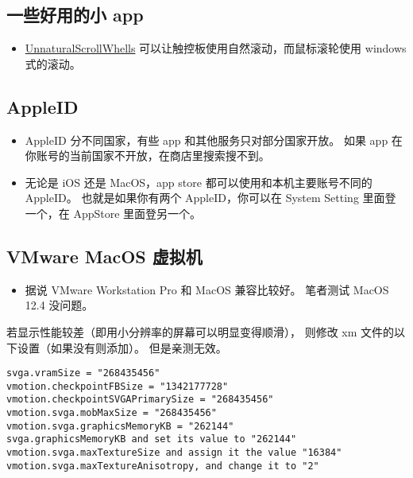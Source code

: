 \subsection{一些好用的小 app}
\begin{itemize}
\item \href{https://github.com/ther0n/UnnaturalScrollWheels}{UnnaturalScrollWhells} 可以让触控板使用自然滚动，而鼠标滚轮使用 windows 式的滚动。
\end{itemize}

\subsection{AppleID}
\begin{itemize}
\item AppleID 分不同国家，有些 app 和其他服务只对部分国家开放。 如果 app 在你账号的当前国家不开放，在商店里搜索搜不到。
\item 无论是 iOS 还是 MacOS，app store 都可以使用和本机主要账号不同的 AppleID。 也就是如果你有两个 AppleID，你可以在 System Setting 里面登一个，在 AppStore 里面登另一个。
\end{itemize}

\subsection{VMware MacOS 虚拟机}
\begin{itemize}
\item 据说 VMware Workstation Pro 和 MacOS 兼容比较好。 笔者测试 MacOS 12.4 没问题。
\end{itemize}

若显示性能较差（即用小分辨率的屏幕可以明显变得顺滑）， 则修改 xm 文件的以下设置（如果没有则添加）。 但是亲测无效。
\begin{lstlisting}[language=none]
svga.vramSize = "268435456"
vmotion.checkpointFBSize = "1342177728"
vmotion.checkpointSVGAPrimarySize = "268435456"
vmotion.svga.mobMaxSize = "268435456"
vmotion.svga.graphicsMemoryKB = "262144"
svga.graphicsMemoryKB and set its value to "262144"
vmotion.svga.maxTextureSize and assign it the value "16384"
vmotion.svga.maxTextureAnisotropy, and change it to "2"
\end{lstlisting}

